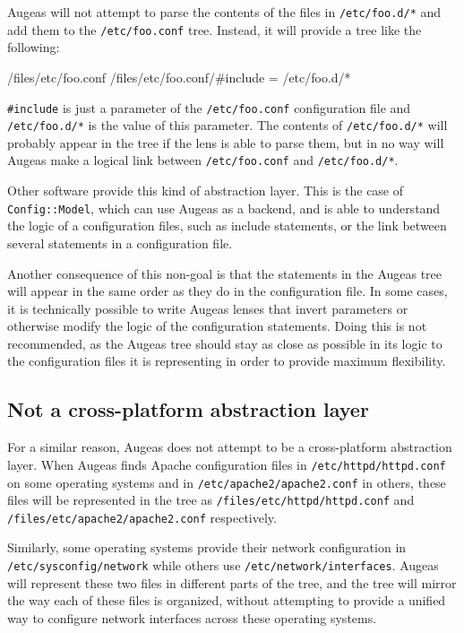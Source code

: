 Augeas will not attempt to parse the contents of the files in \nolinkurl{/etc/foo.d/*} and add them to the \nolinkurl{/etc/foo.conf} tree. Instead, it will provide a tree like the following:

\begin{augtoolsh}[]
/files/etc/foo.conf
/files/etc/foo.conf/#include = /etc/foo.d/*
\end{augtoolsh}

\verb!#include! is just a parameter of the \nolinkurl{/etc/foo.conf} configuration file and \nolinkurl{/etc/foo.d/*} is the value of this parameter. The contents of \nolinkurl{/etc/foo.d/*} will probably appear in the tree if the lens is able to parse them, but in no way will Augeas make a logical link between \nolinkurl{/etc/foo.conf} and \nolinkurl{/etc/foo.d/*}.

Other software provide this kind of abstraction layer. This is the case of \texttt{Config::Model}, which can use Augeas as a backend, and is able to understand the logic of a configuration files, such as include statements, or the link between several statements in a configuration file.

Another consequence of this non-goal is that the statements in the Augeas tree will appear in the same order as they do in the configuration file. In some cases, it is technically possible to write Augeas lenses that invert parameters or otherwise modify the logic of the configuration statements. Doing this is not recommended, as the Augeas tree should stay as close as possible in its logic to the configuration files it is representing in order to provide maximum flexibility.

\subsection{Not a cross-platform abstraction layer}

For a similar reason, Augeas does not attempt to be a cross-platform abstraction layer. When Augeas finds Apache configuration files in \nolinkurl{/etc/httpd/httpd.conf} on some operating systems and in \nolinkurl{/etc/apache2/apache2.conf} in others, these files will be represented in the tree as \nolinkurl{/files/etc/httpd/httpd.conf} and \nolinkurl{/files/etc/apache2/apache2.conf} respectively.

Similarly, some operating systems provide their network configuration in \nolinkurl{/etc/sysconfig/network} while others use \nolinkurl{/etc/network/interfaces}. Augeas will represent these two files in different parts of the tree, and the tree will mirror the way each of these files is organized, without attempting to provide a unified way to configure network interfaces across these operating systems.

